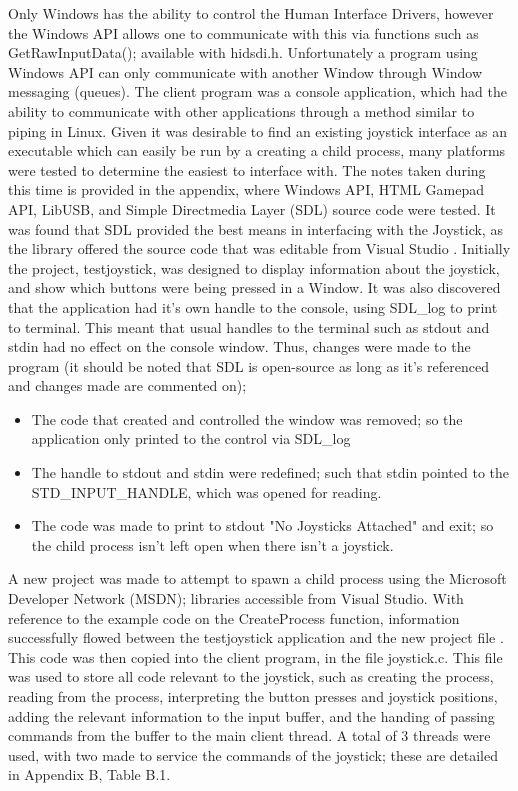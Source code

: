 \documentclass[12pt,openany,a4paper]{book}
\begin{document}
Only Windows has the ability to control the Human Interface Drivers, however the Windows API allows one to communicate with this via functions such as GetRawInputData(); available with hidsdi.h. Unfortunately a program using Windows API can only communicate with another Window through Window messaging (queues). The client program was a console application, which had the ability to communicate with other applications through a method similar to piping in Linux. Given it was desirable to find an existing joystick interface as an executable which can easily be run by a creating a child process, many platforms were tested to determine the easiest to interface with. The notes taken during this time is provided in the appendix, where Windows API, HTML Gamepad API, LibUSB, and Simple Directmedia Layer (SDL) source code were tested. It was found that SDL provided the best means in interfacing with the Joystick, as the library offered the source code that was editable from Visual Studio \cite{SDL}. Initially the project, testjoystick, was designed to display information about the joystick, and show which buttons were being pressed in a Window. It was also discovered that the application had it's own handle to the console, using SDL\_log to print to terminal. This meant that usual handles to the terminal such as stdout and stdin had no effect on the console window. Thus, changes were made to the program (it should be noted that SDL is open-source as long as it's referenced and changes made are commented on);

\begin{itemize}
	\item The code that created and controlled the window was removed; so the application only printed to the control via SDL\_log
	\item The handle to stdout and stdin were redefined; such that stdin pointed to the STD\_INPUT\_HANDLE, which was opened for reading.
	\item The code was made to print to stdout "No Joysticks Attached" and exit; so the child process isn't left open when there isn't a joystick.
\end{itemize}

A new project was made to attempt to spawn a child process using the Microsoft Developer Network (MSDN); libraries accessible from Visual Studio. With reference to the example code on the CreateProcess function, information successfully flowed between the testjoystick application and the new project file \cite{MSDNprocess}. This code was then copied into the client program, in the file joystick.c. This file was used to store all code relevant to the joystick, such as creating the process, reading from the process, interpreting the button presses and joystick positions, adding the relevant information to the input buffer, and the handing of passing commands from the buffer to the main client thread. A total of 3 threads were used, with two made to service the commands of the joystick; these are detailed in Appendix B, Table B.1.
\end{document}
